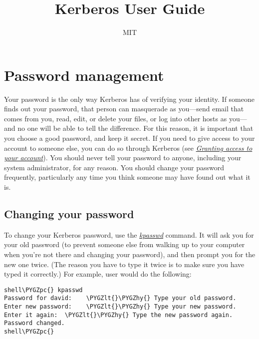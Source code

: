 \documentclass[letterpaper,10pt,english]{sphinxmanual}
\title{Kerberos User Guide}
\date{ }
\author{MIT}
\def\PYGZlt{\char`\<}
\def\PYGZpc{\char`\%}
\def\PYGZhy{\char`\-}
\begin{document}
\maketitle
\tableofcontents
{}\label{user/index::doc}



\chapter{Password management}
\label{user/pwd_mgmt:for-users}\label{user/pwd_mgmt::doc}\label{user/pwd_mgmt:password-management}
Your password is the only way Kerberos has of verifying your identity.
If someone finds out your password, that person can masquerade as
you---send email that comes from you, read, edit, or delete your files,
or log into other hosts as you---and no one will be able to tell the
difference.  For this reason, it is important that you choose a good
password, and keep it secret.  If you need to give access to your
account to someone else, you can do so through Kerberos (see
{\hyperref[user/pwd_mgmt:grant-access]{\emph{Granting access to your account}}}).  You should never tell your password to anyone,
including your system administrator, for any reason.  You should
change your password frequently, particularly any time you think
someone may have found out what it is.


\section{Changing your password}
\label{user/pwd_mgmt:changing-your-password}
To change your Kerberos password, use the {\hyperref[user/user_commands/kpasswd:kpasswd-1]{\emph{kpasswd}}} command.
It will ask you for your old password (to prevent someone else from
walking up to your computer when you're not there and changing your
password), and then prompt you for the new one twice.  (The reason you
have to type it twice is to make sure you have typed it correctly.)
For example, user  would do the following:

\begin{Verbatim}[commandchars=\\\{\}]
shell\PYGZpc{} kpasswd
Password for david:    \PYGZlt{}\PYGZhy{} Type your old password.
Enter new password:    \PYGZlt{}\PYGZhy{} Type your new password.
Enter it again:  \PYGZlt{}\PYGZhy{} Type the new password again.
Password changed.
shell\PYGZpc{}
\end{Verbatim}
\end{document}
